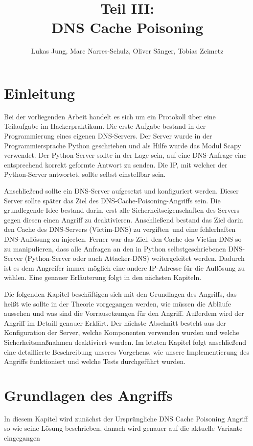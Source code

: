 \documentclass[10pt,a4paper]{article}
\author{Lukas Jung, Marc Narres-Schulz, Oliver Sänger, Tobias Zeimetz}
\title{Teil III: \\DNS Cache Poisoning}
\begin{document}
\maketitle
\newpage

\section{Einleitung}
Bei der vorliegenden Arbeit handelt es sich um ein Protokoll über eine Teilaufgabe im \glqq Hackerpraktikum\grqq. Die erste Aufgabe bestand in der Programmierung eines eigenen DNS-Servers. Der Server wurde in der Programmiersprache Python geschrieben und als Hilfe wurde das Modul Scapy verwendet. Der Python-Server sollte in der Lage sein, auf eine DNS-Anfrage eine entsprechend korrekt geformte Antwort zu senden. Die IP, mit welcher der Python-Server antwortet, sollte selbst einstellbar sein.

Anschließend sollte ein DNS-Server aufgesetzt und konfiguriert werden. Dieser Server sollte später das Ziel des DNS-Cache-Poisoning-Angriffs sein. Die grundlegende Idee bestand darin, erst alle Sicherheitseigenschaften des Servers gegen diesen einen Angriff zu deaktivieren. Anschließend bestand das Ziel darin den Cache des DNS-Servers (Victim-DNS) zu \glqq vergiften\grqq \ und eine fehlerhaften DNS-Auflösung zu injecten. Ferner war das Ziel, den Cache des Victim-DNS so zu manipulieren, dass alle Anfragen an den in Python selbstgeschriebenen DNS-Server (Python-Server oder auch Attacker-DNS) weitergeleitet werden. Dadurch ist es dem Angreifer immer möglich eine andere IP-Adresse für die Auflösung zu wählen. Eine genauer Erläuterung folgt in den nächsten Kapiteln.

Die folgenden Kapitel beschäftigen sich mit den Grundlagen des Angriffs, das heißt wie sollte in der Theorie vorgegangen werden, wie müssen die Abläufe aussehen und was sind die Vorrausetzungen für den Angriff. Außerdem wird der Angriff im Detaill genauer Erklärt. Der nächste Abschnitt besteht aus der Konfiguration der Server, welche Komponenten verwenden wurden und welche Sicherheitsmaßnahmen deaktiviert wurden. Im letzten Kapitel folgt anschließend eine detaillierte Beschreibung unseres Vorgehens, wie unsere Implementierung des Angriffs funktioniert und welche Tests durchgeführt wurden.

\section{Grundlagen des Angriffs}
In diesem Kapitel wird zunächst der Ursprüngliche DNS Cache Poisoning Angriff so wie seine Lösung beschrieben, danach wird genauer auf die aktuelle Variante eingegangen
\end{document}
